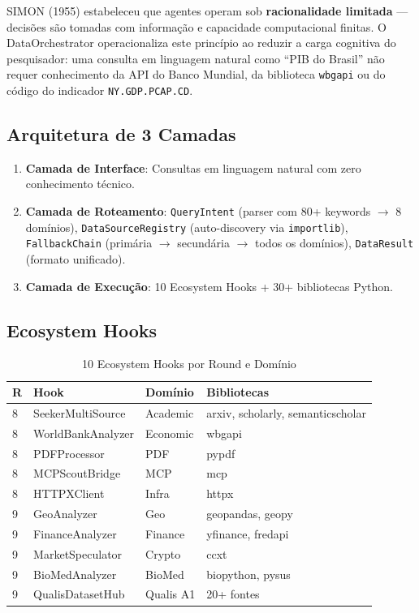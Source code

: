 \documentclass[12pt,a4paper]{article}
\begin{document}
SIMON (1955) estabeleceu que agentes operam sob \textbf{racionalidade limitada} --- decisões são tomadas com informação e capacidade computacional finitas. O DataOrchestrator operacionaliza este princípio ao reduzir a carga cognitiva do pesquisador: uma consulta em linguagem natural como ``PIB do Brasil'' não requer conhecimento da API do Banco Mundial, da biblioteca \texttt{wbgapi} ou do código do indicador \texttt{NY.GDP.PCAP.CD}.

\subsection{Arquitetura de 3 Camadas}

\begin{enumerate}[itemsep=2pt]
  \item \textbf{Camada de Interface}: Consultas em linguagem natural com zero conhecimento técnico.
  \item \textbf{Camada de Roteamento}: \texttt{QueryIntent} (parser com 80+ keywords $\rightarrow$ 8 domínios), \texttt{DataSourceRegistry} (auto-discovery via \texttt{importlib}), \texttt{FallbackChain} (primária $\rightarrow$ secundária $\rightarrow$ todos os domínios), \texttt{DataResult} (formato unificado).
  \item \textbf{Camada de Execução}: 10 Ecosystem Hooks + 30+ bibliotecas Python.
\end{enumerate}

\subsection{Ecosystem Hooks}

\begin{table}[H]
  \centering
  \caption{10 Ecosystem Hooks por Round e Domínio}
  \begin{tabular}{l l l l}
    \toprule
    \textbf{R} & \textbf{Hook} & \textbf{Domínio} & \textbf{Bibliotecas} \\
    \midrule
    8 & SeekerMultiSource   & Academic  & arxiv, scholarly, semanticscholar \\
    8 & WorldBankAnalyzer   & Economic  & wbgapi \\
    8 & PDFProcessor        & PDF       & pypdf \\
    8 & MCPScoutBridge      & MCP       & mcp \\
    8 & HTTPXClient         & Infra     & httpx \\
    9 & GeoAnalyzer         & Geo       & geopandas, geopy \\
    9 & FinanceAnalyzer     & Finance   & yfinance, fredapi \\
    9 & MarketSpeculator    & Crypto    & ccxt \\
    9 & BioMedAnalyzer      & BioMed    & biopython, pysus \\
    9 & QualisDatasetHub    & Qualis A1 & 20+ fontes \\
    \bottomrule
  \end{tabular}
\end{table}
\end{document}
